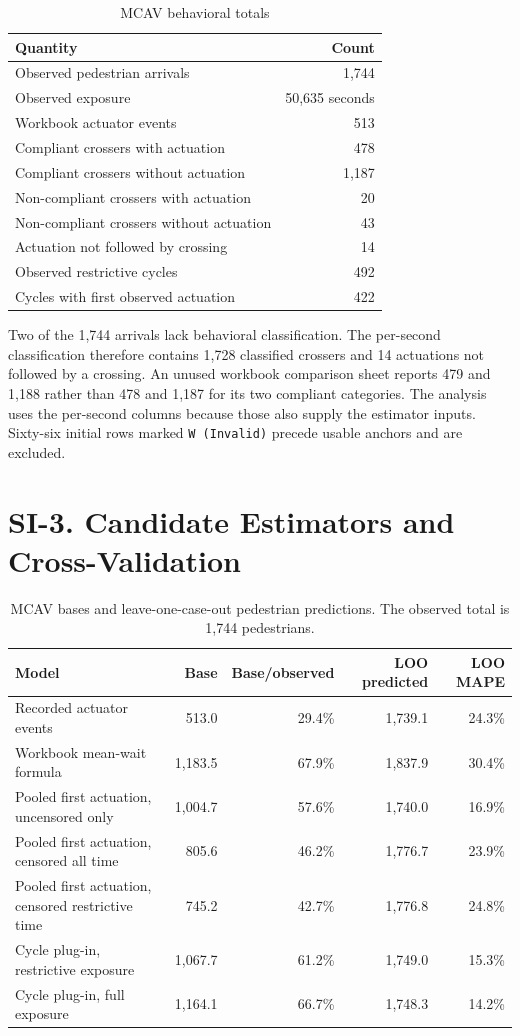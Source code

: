 \documentclass[11pt]{article}
\begin{document}
\begin{table}[htbp]
\centering
\caption{MCAV behavioral totals}
\begin{tabular}{lr}
\toprule
Quantity & Count \\
\midrule
Observed pedestrian arrivals & 1{,}744 \\
Observed exposure & 50{,}635 seconds \\
Workbook actuator events & 513 \\
Compliant crossers with actuation & 478 \\
Compliant crossers without actuation & 1{,}187 \\
Non-compliant crossers with actuation & 20 \\
Non-compliant crossers without actuation & 43 \\
Actuation not followed by crossing & 14 \\
Observed restrictive cycles & 492 \\
Cycles with first observed actuation & 422 \\
\bottomrule
\end{tabular}
\end{table}

Two of the 1,744 arrivals lack behavioral classification. The per-second classification therefore contains 1,728 classified crossers and 14 actuations not followed by a crossing. An unused workbook comparison sheet reports 479 and 1,188 rather than 478 and 1,187 for its two compliant categories. The analysis uses the per-second columns because those also supply the estimator inputs. Sixty-six initial rows marked \texttt{W (Invalid)} precede usable anchors and are excluded.

\section*{SI-3. Candidate Estimators and Cross-Validation}

\begin{table}[htbp]
\centering
\caption{MCAV bases and leave-one-case-out pedestrian predictions. The observed total is 1,744 pedestrians.}
\footnotesize
\begin{tabular}{@{}lrrrr@{}}
\toprule
Model & Base & Base/observed & LOO predicted & LOO MAPE \\
\midrule
Recorded actuator events & 513.0 & 29.4\% & 1{,}739.1 & 24.3\% \\
Workbook mean-wait formula & 1{,}183.5 & 67.9\% & 1{,}837.9 & 30.4\% \\
Pooled first actuation, uncensored only & 1{,}004.7 & 57.6\% & 1{,}740.0 & 16.9\% \\
Pooled first actuation, censored all time & 805.6 & 46.2\% & 1{,}776.7 & 23.9\% \\
Pooled first actuation, censored restrictive time & 745.2 & 42.7\% & 1{,}776.8 & 24.8\% \\
Cycle plug-in, restrictive exposure & 1{,}067.7 & 61.2\% & 1{,}749.0 & 15.3\% \\
Cycle plug-in, full exposure & 1{,}164.1 & 66.7\% & 1{,}748.3 & 14.2\% \\
\bottomrule
\end{tabular}
\end{table}
\end{document}
